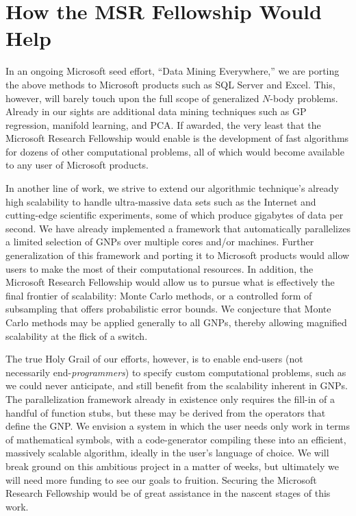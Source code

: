 \documentclass[twoside,leqno,twocolumn]{article}
\begin{document}
\section{How the MSR Fellowship Would Help}
In an ongoing Microsoft seed effort, ``Data Mining Everywhere,'' we
are porting the above methods to Microsoft products such as SQL Server
and Excel.  This, however, will barely touch upon the full scope of
generalized $N$-body problems.  Already in our sights are additional
data mining techniques such as GP regression, manifold learning, and
PCA.  If awarded, the very least that the Microsoft Research
Fellowship would enable is the development of fast algorithms for
dozens of other computational problems, all of which would become
available to any user of Microsoft products.

In another line of work, we strive to extend our algorithmic
technique's already high scalability to handle ultra-massive data sets
such as the Internet and cutting-edge scientific experiments, some of
which produce gigabytes of data per second.  We have already
implemented a framework that automatically parallelizes a limited
selection of GNPs over multiple cores and/or machines.  Further
generalization of this framework and porting it to Microsoft products
would allow users to make the most of their computational resources.
In addition, the Microsoft Research Fellowship would allow us to
pursue what is effectively the final frontier of scalability: Monte
Carlo methods, or a controlled form of subsampling that offers
probabilistic error bounds.  We conjecture that Monte Carlo methods
may be applied generally to all GNPs, thereby allowing magnified
scalability at the flick of a switch.

The true Holy Grail of our efforts, however, is to enable end-users
(not necessarily end-{\em programmers}) to specify custom
computational problems, such as we could never anticipate, and still
benefit from the scalability inherent in GNPs.  The parallelization
framework already in existence only requires the fill-in of a handful
of function stubs, but these may be derived from the operators that
define the GNP.  We envision a system in which the user needs only
work in terms of mathematical symbols, with a code-generator compiling
these into an efficient, massively scalable algorithm, ideally in the
user's language of choice.  We will break ground on this ambitious
project in a matter of weeks, but ultimately we will need more funding
to see our goals to fruition.  Securing the Microsoft Research
Fellowship would be of great assistance in the nascent stages of this
work.

{\footnotesize


}
\end{document}
